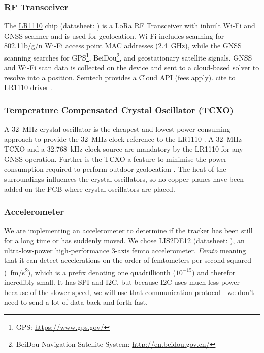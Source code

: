\subsubsection{RF Transceiver}
The \hyperref[bom:lr1110]{LR1110} chip (datasheet: ) is a \ac{LoRa} RF Transceiver with inbuilt Wi-Fi and \ac{GNSS} scanner and is used for geolocation. Wi-Fi includes scanning for 802.11b/g/n Wi-Fi access point \ac{MAC} addresses (\SI{2.4}{\giga\hertz}), while the \ac{GNSS} scanning searches for \ac{GPS}\footnote{GPS: \url{https://www.gps.gov/}}, BeiDou\footnote{BeiDou Navigation Satellite System: \url{http://en.beidou.gov.cn/}}, and geostationary satellite signals. \ac{GNSS} and Wi-Fi scan data is collected on the device and sent to a cloud-based solver to resolve into a position. Semtech provides a Cloud API (fees apply).
cite to LR1110 driver \cite{lr11xx_driver}.

\subsubsection{Temperature Compensated Crystal Oscillator (TCXO)}
A \SI{32}{\mega\hertz} crystal oscillator is the cheapest and lowest power-consuming approach to provide the \SI{32}{\mega\hertz} clock reference to the LR1110 \cite[p.~50]{LR1110_user_manual}.
A \SI{32}{\mega\hertz} \ac{TCXO} and a \SI{32.768}{\kilo\hertz} clock source are mandatory by the LR1110 for any \ac{GNSS} operation. Further is the \ac{TCXO} a feature to minimise the power consumption required to perform outdoor geolocation \cite[p.~51, p.~132]{LR1110_user_manual}. The heat of the surroundings influences the crystal oscillators, so no copper planes have been added on the \ac{PCB} where crystal oscillators are placed. %

\subsubsection{Accelerometer}
We are implementing an accelerometer to determine if the tracker has been still for a long time or has suddenly moved. We chose \hyperref[bom:lis2de12]{LIS2DE12} (datasheet: ), an ultra-low-power high-performance 3-axis femto accelerometer. \textit{Femto} meaning that it can detect accelerations on the order of femtometers per second squared (\SI{}{\femto\meter/\second^2}), which is a prefix denoting one quadrillionth ($10^{-15}$) and therefor incredibly small. It has \ac{SPI} and \ac{I2C}, but because \ac{I2C} uses much less power because of the slower speed, we will use that communication protocol - we don't need to send a lot of data back and forth fast.

